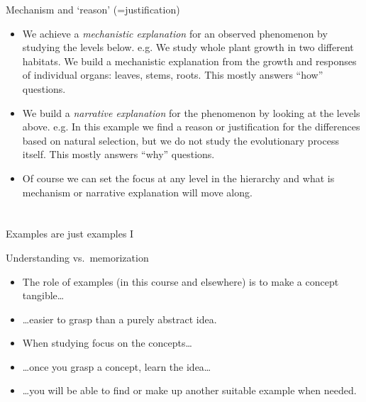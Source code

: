 \documentclass[10pt]{beamer}
\begin{document}
\begin{frame}{Mechanism and `reason' (=justification)}
    \begin{itemize}
        \item<1> We achieve a \emph{mechanistic explanation} for an
        observed phenomenon by studying the levels below.
        e.g. We study whole plant growth in two different habitats.
        We build a mechanistic
        explanation from the growth and responses of individual
        organs: leaves, stems, roots. This mostly answers ``how''
        questions.

        \item<2> We build a \emph{narrative explanation} for the phenomenon
        by looking at the levels above.
        e.g. In this example we find a reason or justification for
        the differences based on natural selection, but we do not study
        the evolutionary process itself. This mostly answers ``why''
        questions.

        \item<3> Of course we can set the focus at any level in the hierarchy and what is mechanism or narrative explanation will move along.~\DExamples
    \end{itemize}
\end{frame}

\section{}

\begin{frame}{Examples are just examples I}

  \begin{alertblock}{Understanding vs.\ memorization}
    \begin{itemize}
      \item The role of examples (in this course and elsewhere) is to make a concept tangible\ldots
      \item \ldots easier to grasp than a purely abstract idea.
      \item When studying focus on the concepts\ldots
      \item \ldots once you grasp a concept, learn the idea\ldots
      \item \ldots you will be able to find or make up another suitable example when needed.
    \end{itemize}
  \end{alertblock}

\end{frame}
\end{document}
